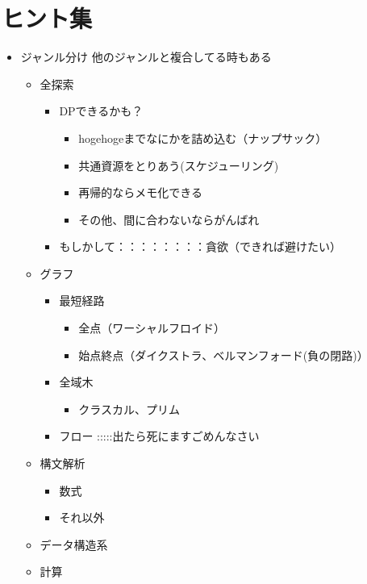 \documentclass{jsarticle}
\begin{document}
\clearpage
\section{ヒント集}
\begin{itemize}
  \item ジャンル分け
  \newline 他のジャンルと複合してる時もある
  \begin{itemize}
    \item 全探索
    \begin{itemize}
      \item DPできるかも？
      \begin{itemize}
        \item hogehogeまでなにかを詰め込む（ナップサック）
        \item 共通資源をとりあう(スケジューリング)
        \item 再帰的ならメモ化できる
        \item その他、間に合わないならがんばれ
      \end{itemize}
      \item もしかして：：：：：：：：貪欲（できれば避けたい）
    \end{itemize}
    \item グラフ
    \begin{itemize}
      \item 最短経路
      \begin{itemize}
        \item 全点（ワーシャルフロイド）
        \item 始点終点（ダイクストラ、ベルマンフォード(負の閉路)）
      \end{itemize}
      \item 全域木
      \begin{itemize}
        \item クラスカル、プリム
      \end{itemize}
      \item フロー :::::出たら死にますごめんなさい
    \end{itemize}
    \item 構文解析
    \begin{itemize}
      \item 数式
      \item それ以外
    \end{itemize}
    \item データ構造系
    \item 計算
    \begin{itemize}

\end{itemize}
\end{itemize}
\end{itemize}
\end{document}
